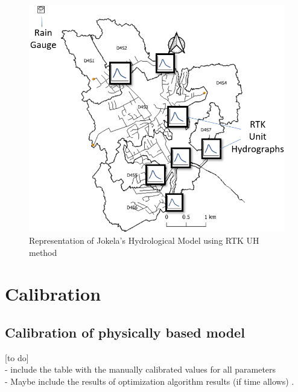 \begin{figure}[ht]
    \centering
	\includegraphics[scale=0.45]{figures/swmm_rtk_model.png}
	\caption{Representation of Jokela's Hydrological Model using RTK UH method}
	\label{fig:rtkmodelhydro}
\end{figure}




\section{Calibration}

\subsection{Calibration of physically based model}
[to do]\\
- include the table with the manually calibrated values for all parameters\\
- Maybe include the results of optimization algorithm results (if time allows) .\\


